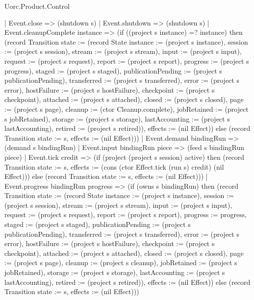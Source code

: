 \begin{lexlean}{Uorc.Product.Control}
\begin{semanticmodule}
{    | Event.close => (shutdown s)
    | Event.shutdown => (shutdown s)
    | Event.cleanupComplete instance => (if ((project s instance) =? instance) then (record Transition {state := (record State {instance := (project s instance), session := (project s session), stream := (project s stream), input := (project s input), request := (project s request), report := (project s report), progress := (project s progress), staged := (project s staged), publicationPending := (project s publicationPending), transferred := (project s transferred), error := (project s error), hostFailure := (project s hostFailure), checkpoint := (project s checkpoint), attached := (project s attached), closed := (project s closed), page := (project s page), cleanup := (ctor Cleanup.complete), jobRetained := (project s jobRetained), storage := (project s storage), lastAccounting := (project s lastAccounting), retired := (project s retired)}), effects := (nil Effect)}) else (record Transition {state := s, effects := (nil Effect)}))
    | Event.demand bindingRun => (demand s bindingRun)
    | Event.input bindingRun piece => (feed s bindingRun piece)
    | Event.tick credit => (if (project (project s session) active) then (record Transition {state := s, effects := (cons (ctor Effect.tick (run s) credit) (nil Effect))}) else (record Transition {state := s, effects := (nil Effect)}))
    | Event.progress bindingRun progress => (if (owns s bindingRun) then (record Transition {state := (record State {instance := (project s instance), session := (project s session), stream := (project s stream), input := (project s input), request := (project s request), report := (project s report), progress := progress, staged := (project s staged), publicationPending := (project s publicationPending), transferred := (project s transferred), error := (project s error), hostFailure := (project s hostFailure), checkpoint := (project s checkpoint), attached := (project s attached), closed := (project s closed), page := (project s page), cleanup := (project s cleanup), jobRetained := (project s jobRetained), storage := (project s storage), lastAccounting := (project s lastAccounting), retired := (project s retired)}), effects := (nil Effect)}) else (record Transition {state := s, effects := (nil Effect)}))
}
\end{semanticmodule}
\end{lexlean}
